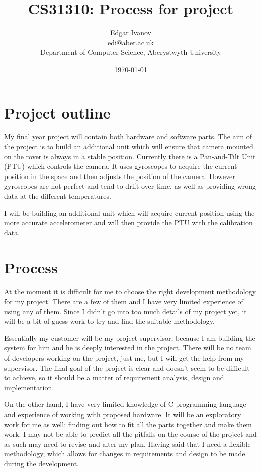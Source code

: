 \documentclass[]{report}
\begin{document}
\title{CS31310: Process for project}
\author{Edgar Ivanov\\ edi@aber.ac.uk \\ Department of Computer Science, Aberystwyth University}
\date{\today}
\maketitle
\section*{Project outline}
My final year project will contain both hardware and software parts. The aim of the project is to build an additional unit which will ensure that camera mounted on the rover is always in a stable position. Currently there is a Pan-and-Tilt Unit (PTU) which controls the camera. It uses gyroscopes to acquire the current position in the space and then adjusts the position of the camera. However gyroscopes are not perfect and tend to drift over time, as well as providing wrong data at the different temperatures. 

I will be building an additional unit which will acquire current position using the more accurate accelerometer and will then provide the PTU with the calibration data.

\section*{Process}
At the moment it is difficult for me to choose the right development methodology for my project. There are a few of them and I have very limited experience of using any of them. Since I didn't go into too much details of my project yet, it will be a bit of guess work to try and find the suitable methodology.

Essentially my customer will be my project supervisor, because I am building the system for him and he is deeply interested in the project. There will be no team of developers working on the project, just me, but I will get the help from my supervisor. The final goal of the project is clear and doesn't seem to be difficult to achieve, so it should be a matter of requirement analysis, design and implementation.

On the other hand, I have very limited knowledge of C programming language and experience of working with proposed hardware. It will be an exploratory work for me as well: finding out how to fit all the parts together and make them work. I may not be able to predict all the pitfalls on the course of the project and as such may need to revise and alter my plan. Having said that I need a flexible methodology, which allows for changes in requirements and design to be made during the development. 
\end{document}
